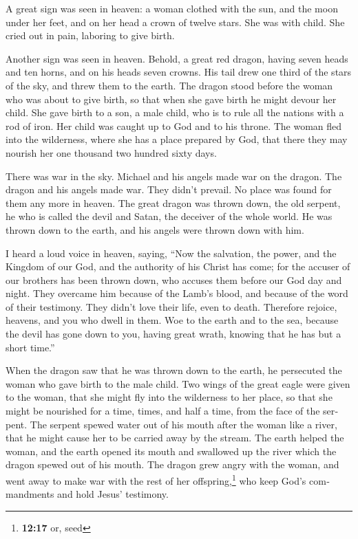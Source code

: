 \begin{paracol}{2}
\begin{otherlanguage}{english}
 A great sign was seen in heaven: a woman clothed with the
sun, and the moon under her feet, and on her head a crown of twelve
stars.  She was with child. She cried out in pain,
laboring to give birth.

 Another sign was seen in heaven. Behold, a great red
dragon, having seven heads and ten horns, and on his heads seven crowns.
 His tail drew one third of the stars of the sky, and
threw them to the earth. The dragon stood before the woman who was about
to give birth, so that when she gave birth he might devour her child.
 She gave birth to a son, a male child, who is to rule all
the nations with a rod of iron. Her child was caught up to God and to
his throne.  The woman fled into the wilderness, where she
has a place prepared by God, that there they may nourish her one
thousand two hundred sixty days.

 There was war in the sky. Michael and his angels made war
on the dragon. The dragon and his angels made war.  They
didn't prevail. No place was found for them any more in heaven.
 The great dragon was thrown down, the old serpent, he who
is called the devil and Satan, the deceiver of the whole world. He was
thrown down to the earth, and his angels were thrown down with him.

 I heard a loud voice in heaven, saying, ``Now the
salvation, the power, and the Kingdom of our God, and the authority of
his Christ has come; for the accuser of our brothers has been thrown
down, who accuses them before our God day and night. 
They overcame him because of the Lamb's blood, and because of the word
of their testimony. They didn't love their life, even to death.
 Therefore rejoice, heavens, and you who dwell in them.
Woe to the earth and to the sea, because the devil has gone down to you,
having great wrath, knowing that he has but a short time.''

 When the dragon saw that he was thrown down to the
earth, he persecuted the woman who gave birth to the male child.
 Two wings of the great eagle were given to the woman,
that she might fly into the wilderness to her place, so that she might
be nourished for a time, times, and half a time, from the face of the
serpent.  The serpent spewed water out of his mouth after
the woman like a river, that he might cause her to be carried away by
the stream.  The earth helped the woman, and the earth
opened its mouth and swallowed up the river which the dragon spewed out
of his mouth.  The dragon grew angry with the woman, and
went away to make war with the rest of her offspring,\footnote{\textbf{12:17}
  or, seed} who keep God's commandments and hold Jesus' testimony.


\end{otherlanguage}
\end{paracol}
